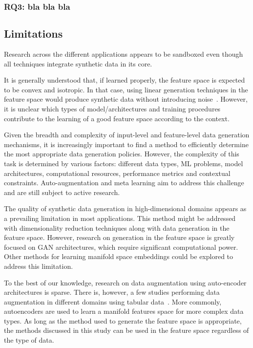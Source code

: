 \documentclass[parskip=full]{scrartcl}
\begin{document}
\subsubsection{RQ3: bla bla bla}

\subsection{Limitations}

Research across the different applications appears to be sandboxed even though
all techniques integrate synthetic data in its core.

It is generally understood that, if learned properly, the feature space is
expected to be convex and isotropic. In that case, using linear generation
techniques in the feature space would produce synthetic data without
introducing noise~\cite{cheung2020modals}. However, it is unclear which types
of model/architectures and training procedures contribute to the learning of a
good feature space according to the context.

Given the breadth and complexity of input-level and feature-level data
generation mechanisms, it is increasingly important to find a method to
efficiently determine the most appropriate data generation policies. However,
the complexity of this task is determined by various factors: different data
types, ML problems, model architectures, computational resources, performance
metrics and contextual constraints. Auto-augmentation and meta learning aim to
address this challenge and are still subject to active research.

The quality of synthetic data generation in high-dimensional domains appears
as a prevailing limitation in most applications. This method might be
addressed with dimensionality reduction techniques along with data generation
in the feature space. However, research on generation in the feature space is
greatly focused on GAN architectures, which require significant computational
power. Other methods for learning manifold space embeddings could be explored
to address this limitation.

To the best of our knowledge, research on data augmentation using auto-encoder
architectures is sparse. There is, however, a few studies performing data
augmentation in different domains using tabular data~\cite{delgado2021deep}.
More commonly, autoencoders are used to learn a manifold features space for
more complex data types. As long as the method used to generate the feature
space is appropriate, the methods discussed in this study can be used in the
feature space regardless of the type of data.
\end{document}
